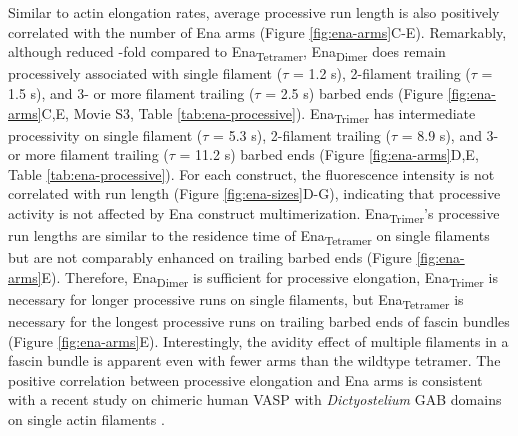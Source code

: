 Similar to actin elongation rates, average processive run length is also positively correlated with the number of Ena arms (Figure \ref{fig:ena-arms}C-E). Remarkably, although reduced -fold compared to Ena\textsubscript{Tetramer}, Ena\textsubscript{Dimer} does remain processively associated with single filament ($\tau$ = 1.2 s), 2-filament trailing ($\tau$ = 1.5 s), and 3- or more filament trailing ($\tau$ = 2.5 s) barbed ends (Figure \ref{fig:ena-arms}C,E, Movie S3, Table \ref{tab:ena-processive}). Ena\textsubscript{Trimer} has intermediate processivity on single filament ($\tau$ = 5.3 s), 2-filament trailing ($\tau$ = 8.9 s), and 3- or more filament trailing ($\tau$ = 11.2 s) barbed ends (Figure \ref{fig:ena-arms}D,E, Table \ref{tab:ena-processive}). For each construct, the fluorescence intensity is not correlated with run length (Figure \ref{fig:ena-sizes}D-G), indicating that processive activity is not affected by Ena construct multimerization. Ena\textsubscript{Trimer}'s processive run lengths are similar to the residence time of Ena\textsubscript{Tetramer} on single filaments but are not comparably enhanced on trailing barbed ends (Figure \ref{fig:ena-arms}E). Therefore, Ena\textsubscript{Dimer} is sufficient for processive elongation, Ena\textsubscript{Trimer} is necessary for longer processive runs on single filaments, but Ena\textsubscript{Tetramer} is necessary for the longest processive runs on trailing barbed ends of fascin bundles (Figure \ref{fig:ena-arms}E). Interestingly, the avidity effect of multiple filaments in a fascin bundle is apparent even with fewer arms than the wildtype tetramer. The positive correlation between processive elongation and Ena arms is consistent with a recent study on chimeric human VASP with \textit{Dictyostelium} GAB domains on single actin filaments \citep{bruhmann_distinct_2017}. 

